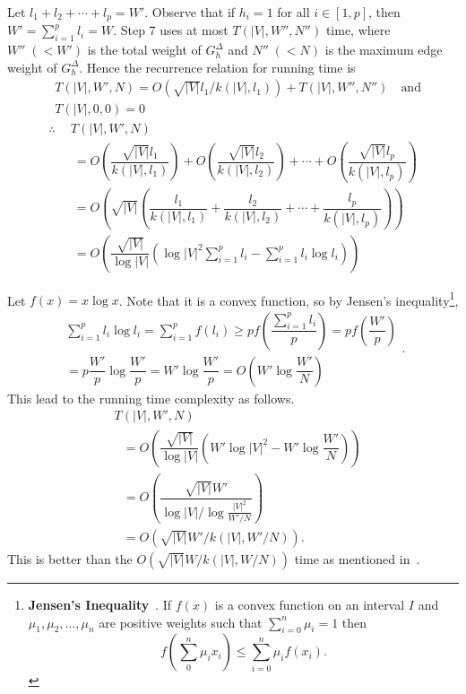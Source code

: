 \documentclass[runningheads,a4paper]{llncs}
\begin{document}
 Let $l_1+l_2+ \cdots + l_p=W'$. Observe that if
$h_i=1$ for all $i \in [1,p]$, then $W'=\sum_{i=1}^p l_i=W$. Step 7
uses at most $T(|V|,W'',N'')$ time, where $W''\;(<W')$ is the total weight of $G_h^\Delta$ and $N''\;(<N)$ is the
maximum edge weight of $G_h^\Delta$. Hence the recurrence
relation for running time is
\begin{align*}
& T(|V|,W',{N})= O(\sqrt{|V|}l_1/k(|V|,l_1)) + T(|V|,W'',N'') \quad\mbox{and}\\[5pt]
&T(|V|,0,0)=0
\end{align*}
\begin{align*}
\therefore &~~T(|V|,W',{N}) \\[4pt]
	&~~~= O\left(\dfrac{\sqrt{|V|}l_1}{k(|V|,l_1)}\right) + O\left(\dfrac{\sqrt{|V|}l_2}{k(|V|,l_2)}\right) + \cdots + O\left(\dfrac{\sqrt{|V|}l_p}{k(|V|,l_p)}\right) \\[4pt]
	&~~~= O\left(\sqrt{|V|} \left(\dfrac{l_1}{k(|V|,l_1)}+\dfrac{l_2}{k(|V|,l_2)}+\cdots+\dfrac{l_p}{k(|V|,l_p)}\right)\right) \\[4pt]
	&~~~= O\left(\dfrac{\sqrt{|V|}}{\log |V|} \left(\log |V|^2 \sum \limits_{i=1}^p l_i - \sum \limits_{i=1}^p l_i \log l_i \right)\right)
\end{align*}

Let $f(x)=x \log{x}$. Note that it is a convex function, so by Jensen's inequality\footnote{\textbf{Jensen's Inequality}~\cite{hardy34}. If
$f(x)$ is a convex function on an interval $I$ and $\mu_1,
\mu_2,\ldots,\mu_n$ are positive weights such that $\sum_{i =
0}^{n} \mu_i=1$ then $$f\left(\sum_0^n \mu_i x_i\right) \leq
\sum_{i=0}^n  \mu_i f(x_i).$$},
$$\begin{array}{l}
\sum\limits_{i=1}^p l_i \log l_i = \sum\limits_{i=1}^p f(l_i) \geq p f\left(\dfrac{\sum\limits_{i=1}^p l_i}{p}\right)
 = p f\left(\dfrac{W'}{p}\right)\\[25pt]
 = p \dfrac{W'}{p} \log \dfrac{W'}{p} = W' \log \dfrac{W'}{p} = O\left(W' \log \dfrac{W'}{N}\right)
\end{array}.$$
This lead to the running time complexity as follows.
$$
\begin{array}{ll}
&T(|V|,W',N) 	\\[5pt]
&~~~= O\left(\dfrac{\sqrt{|V|}}{\log |V|} \left( W'\log {|V|^2} -  W' \log \dfrac{W'}{{N}} \right)\right) \\[13pt]
&~~~= O\left(\dfrac{\sqrt{|V|}W'}{\log |V|/\log \frac{|V|^2}{W'/{N}}}\right)\\[5pt]
&~~~= O(\sqrt{|V|}W'/k(|V|,W'/{N})).
\end{array}
$$
This is better than the $O(\sqrt{|V|}W/k(|V|,W/N))$ time as
mentioned in~\cite{kao02}. 
\end{document}
